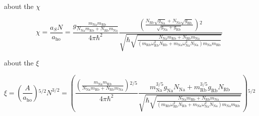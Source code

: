 about the $\chi $

\begin{equation}\chi =\frac{a_SN}{a_{\text{ho}}}=\frac{g \frac{m_{\text{Na}}m_{\text{Rb}}}{N_{\text{Na}}m_{\text{Rb}}+N_{\text{Rb}}m_{\text{Na}}}}{4\pi  \hbar
^2}\frac{\left(\frac{N_{\text{Rb}}\sqrt{g_{\text{Na}}}+N_{\text{Na}}\sqrt{g_{\text{Rb}}}}{\sqrt{g_{\text{Na}}+g_{\text{Rb}}}}\right){}^2}{\sqrt{\hbar
\sqrt{\frac{N_{\text{Na}}m_{\text{Rb}}+N_{\text{Rb}}m_{\text{Na}}}{\left(m_{\text{Rb}} \omega _{\text{Rb}}^2N_{\text{Rb}}+m_{\text{Na}} \omega _{\text{Na}}^2N_{\text{Na}}\right)m_{\text{Na}}m_{\text{Rb}}}}}}\end{equation}

about the $\xi $

\begin{equation}\xi =\left(\frac{A}{a_{\text{ho}}}\right){}^{5/2}N^{3/2}=\left(\frac{\left(\frac{ m_{\text{Na}}m_{\text{Rb}}}{N_{\text{Na}}m_{\text{Rb}}+N_{\text{Rb}}m_{\text{Na}}}\right){}^{2/5}}{4\pi
 \hbar ^2}\frac{m_{\text{Na}}^{3/5}g_{\text{Na}}N_{\text{Na}}+m_{\text{Rb}}^{3/5}g_{\text{Rb}}N_{\text{Rb}}}{\sqrt{\hbar \sqrt{\frac{N_{\text{Na}}m_{\text{Rb}}+N_{\text{Rb}}m_{\text{Na}}}{\left(m_{\text{Rb}}
\omega _{\text{Rb}}^2N_{\text{Rb}}+m_{\text{Na}} \omega _{\text{Na}}^2N_{\text{Na}}\right)m_{\text{Na}}m_{\text{Rb}}}}}}\right){}^{5/2}\end{equation}

\begin{equation}\text{}\end{equation}


